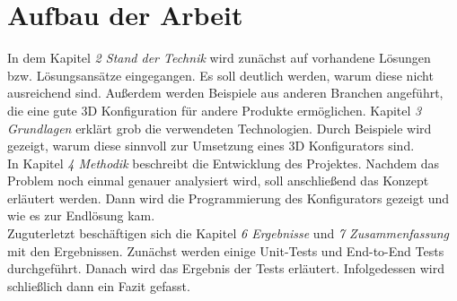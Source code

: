 \section{Aufbau der Arbeit}
\label{sec:aufbau}
%
In dem Kapitel \textit{2 Stand der Technik} wird zunächst auf vorhandene Lösungen bzw. Lösungsansätze eingegangen. Es soll deutlich werden, warum diese nicht ausreichend sind. Außerdem werden Beispiele aus anderen Branchen angeführt, die eine gute 3D Konfiguration für andere Produkte ermöglichen. Kapitel \textit{3 Grundlagen} erklärt grob die verwendeten Technologien. Durch Beispiele wird gezeigt, warum diese sinnvoll zur Umsetzung eines 3D Konfigurators sind. \\
%
In Kapitel \textit{4 Methodik} beschreibt die Entwicklung des Projektes. Nachdem das Problem noch einmal genauer analysiert wird, soll anschließend das Konzept erläutert werden. Dann wird die Programmierung des Konfigurators gezeigt und wie es zur Endlösung kam. \\
Zuguterletzt beschäftigen sich die Kapitel \textit{6 Ergebnisse} und \textit{7 Zusammenfassung} mit den Ergebnissen. Zunächst werden einige Unit-Tests und End-to-End Tests durchgeführt. Danach wird das Ergebnis der Tests erläutert. Infolgedessen wird schließlich dann ein Fazit gefasst.
%